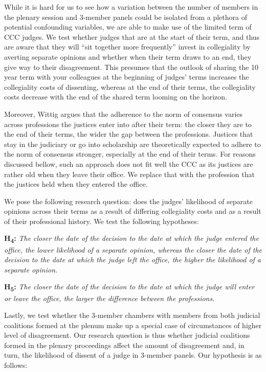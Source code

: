 \documentclass[
  11pt,
]{article}
\begin{document}
While it is hard for us to see how a variation between the number of
members in the plenary session and 3-member panels could be isolated
from a plethora of potential confounding variables, we are able to make
use of the limited term of CCC judges. We test whether judges that are
at the start of their term, and thus are aware that they will ``sit
together more frequently'' invest in collegiality by averting separate
opinions and whether when their term draws to an end, they give way to
their disagreement. This presumes that the outlook of sharing the 10
year term with your colleagues at the beginning of judges' terms
increases the collegiality costs of dissenting, whereas at the end of
their terms, the collegiality costs decrease with the end of the shared
term looming on the horizon.

Moreover, Wittig argues that the adherence to the norm of consensus
varies across professions the justices enter into after their term: the
closer they are to the end of their terms, the wider the gap between the
professions. Justices that stay in the judiciary or go into scholarship
are theoretically expected to adhere to the norm of consensus stronger,
especially at the end of their terms. For reasons discussed bellow, such
an approach does not fit well the CCC as its justices are rather old
when they leave their office. We replace that with the profession that
the justices held when they entered the office.

We pose the following research question: does the judges' likelihood of
separate opinions across their terms as a result of differing
collegiality costs and as a result of their professional history. We
test the following hypotheses:

\textbf{H\textsubscript{4}:} \emph{The closer the date of the decision
to the date at which the judge entered the office, the lower likelihood
of a separate opinion, whereas the closer the date of the decision to
the date at which the judge left the office, the higher the likelihood
of a separate opinion.}

\textbf{H\textsubscript{5}:} \emph{The closer the date of the decision
to the date at which the judge will enter or leave the office, the
larger the difference between the professions.}

Lastly, we test whether the 3-member chambers with members from both
judicial coalitions formed at the plenum make up a special case of
circumstances of higher level of disagreement. Our research question is
thus whether judicial coalitions formed in the plenary proceedings
affect the amount of disagreement and, in turn, the likelihood of
dissent of a judge in 3-member panels. Our hypothesis is as follows:
\end{document}
